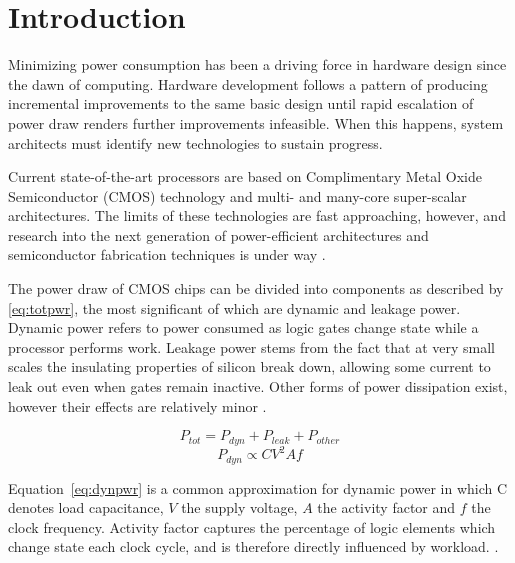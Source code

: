 \section{Introduction}

Minimizing power consumption has been a driving force in hardware design since the dawn of computing. Hardware development follows a pattern of producing incremental improvements to the same basic design until rapid escalation of power draw renders further improvements infeasible. When this happens, system architects must identify new technologies to sustain progress.

Current state-of-the-art processors are based on Complimentary Metal Oxide Semiconductor (CMOS) technology and multi- and many-core super-scalar architectures. The limits of these technologies are fast  approaching, however, and research into the next generation of power-efficient architectures and semiconductor fabrication techniques is under way \cite{esmaeilzadeh:2011aa}.

The power draw of CMOS chips can be divided into components as described by \autoref{eq:totpwr}, the most significant of which are dynamic and leakage power. Dynamic power refers to power consumed as logic gates change state while a processor performs work. Leakage power stems from the fact that at very small scales the insulating properties of silicon break down, allowing some current to leak out even when gates remain inactive. Other forms of power dissipation exist, however their effects are relatively minor \cite{kaxiras:2008aa}.


\begin{equation}
\label{eq:totpwr}
P_{tot} = P_{dyn} + P_{leak} + P_{other}
\end{equation}
\begin{equation} 
\label{eq:dynpwr}
P_{dyn} \propto CV^{2}Af
\end{equation}

Equation~\ref{eq:dynpwr} is a common approximation for dynamic power in which C denotes load capacitance, $V$ the supply voltage, $A$ the activity factor and $f$ the clock frequency. Activity factor captures the percentage of logic elements which change state each clock cycle, and is therefore directly influenced by workload. .



